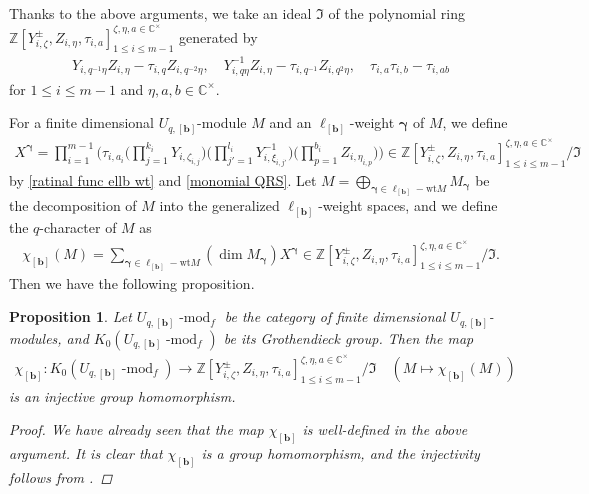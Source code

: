 \documentclass[12pt]{amsart}
\newtheorem{prop}[thm]{Proposition}
\numberwithin{equation}{thm}
\newcommand\CC{\mathbb C}
\newcommand\ZZ{\mathbb Z}
\newcommand\bb{\mathbf b}
\newcommand\fI{\mathfrak I}
\newcommand\z{\zeta}
\newcommand\Bg{\boldsymbol\gamma}
\newcommand\ra{\rightarrow}
\newcommand\cmod{\operatorname{-mod}}
\newcommand{\lbwt}{\operatorname{\ell_{[\bb]}-wt}}
\newcounter{ni}
\newcounter{go}
\begin{document}
Thanks to the above arguments, 
we take an ideal $\fI$ of the polynomial ring 
$\ZZ [  Y_{i, \z}^{\pm}, Z_{i, \eta}, \tau_{i,a}]^{\z, \eta, a \in \CC^{\times}}_{1 \leq i \leq m-1} $ 
generated by 
\begin{align*}
Y_{i, q^{-1} \eta} Z_{i, \eta} - \tau_{i,q} Z_{i, q^{-2} \eta}, 
\quad 
Y_{i, q \eta}^{-1} Z_{i, \eta} - \tau_{i, q^{-1}} Z_{i, q^2 \eta}, 
\quad 
\tau_{i,a} \tau_{i,b} - \tau_{i, ab}
\end{align*}
for $1 \leq i \leq m-1$ and $\eta, a,b \in \CC^{\times}$. 

For a finite dimensional $U_{q,[\bb]}$-module $M$ and an $\ell_{[\bb]}$-weight $\Bg$ of $M$, 
we define 
\begin{align*}
X^{\Bg} = \prod_{i=1}^{m-1} \Big( 
	\tau_{i, a_i} \big( \prod_{j=1}^{k_i} Y_{i, \z_{i,j}} \big) \big( \prod_{j'=1}^{l_i} Y_{i, \xi_{i, j'}}^{-1} \big) 
 	\big( \prod_{p=1}^{b_i} Z_{i, \eta_{i,p}}  \big) \Big) 
\in \ZZ [  Y_{i, \z}^{\pm}, Z_{i, \eta}, \tau_{i,a}]^{\z, \eta, a \in \CC^{\times}}_{1 \leq i \leq m-1} / \fI
\end{align*}
by \eqref{ratinal func ellb wt} and \eqref{monomial QRS}. 
%
Let $M= \bigoplus_{\Bg \in \lbwt M} M_{\Bg}$ be the decomposition of $M$ into the generalized $\ell_{[\bb]}$-weight spaces, 
and we define the $q$-character of $M$ as 
\begin{align*}
\chi_{[\bb]} (M) = \sum_{\Bg \in \lbwt M} (\dim M_{\Bg}) X^{\Bg} 
\in \ZZ [  Y_{i, \z}^{\pm}, Z_{i, \eta}, \tau_{i,a}]^{\z, \eta, a \in \CC^{\times}}_{1 \leq i \leq m-1} / \fI. 
\end{align*}
Then we have the following proposition. 
\begin{prop} 
Let $U_{q,[\bb]}\cmod_f$ be the category of finite dimensional $U_{q,[\bb]}$-modules, 
and $K_0 (U_{q,[\bb]} \cmod_f)$ be its Grothendieck group. 
Then the map 
\begin{align*}
\chi_{[\bb]} : K_0 (U_{q,[\bb]} \cmod_f) 
	\ra \ZZ [  Y_{i, \z}^{\pm}, Z_{i, \eta}, \tau_{i,a}]^{\z, \eta, a \in \CC^{\times}}_{1 \leq i \leq m-1} / \fI
\quad 
(M \mapsto \chi_{[\bb]} (M) ) 
\end{align*} 
is an injective group homomorphism. 
\begin{proof}
We have already seen that the map $\chi_{[\bb]}$ is well-defined in the above argument. 
It is clear that $\chi_{[\bb]}$ is a group homomorphism, 
and the injectivity follows from \cite[Corollary 5.1]{Her23}. 
\end{proof}
\end{prop}
\end{document}
